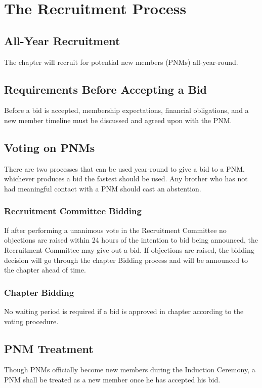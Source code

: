 \chapter{The Recruitment Process}
\label{cha:the-recruitment-process}

\section{All-Year Recruitment}
\label{sec:all-year-recruitment}

The chapter will recruit for potential new members (PNMs) all-year-round.

\section{Requirements Before Accepting a Bid}
\label{sec:requirements-before-accepting-a-bid}

Before a bid is accepted, membership expectations, financial obligations, and a
new member timeline must be discussed and agreed upon with the PNM\@.

\section{Voting on PNMs}
\label{sec:voting-on-pnms}

There are two processes that can be used year-round to
give a bid to a PNM, whichever produces a bid the fastest should be used.
Any brother who has not had meaningful contact with a PNM should cast an abstention.

\subsection{Recruitment Committee Bidding}
\label{subsec:recruitment-committee-bidding}

If after performing a unanimous vote in the Recruitment Committee no objections
are raised within 24 hours of the intention to bid being announced, the
Recruitment Committee may give out a bid.
If objections are raised, the bidding decision will go through the chapter
Bidding process and will be announced to the chapter ahead of time.

\subsection{Chapter Bidding} 
\label{subsec:chappter-bidding}

No waiting period is required if a bid is approved
in chapter according to the voting procedure.

\section{PNM Treatment}
\label{sec:pnm-treatment}

Though PNMs officially become new members during the Induction Ceremony, a PNM shall be
treated as a new member once he has accepted his bid.
